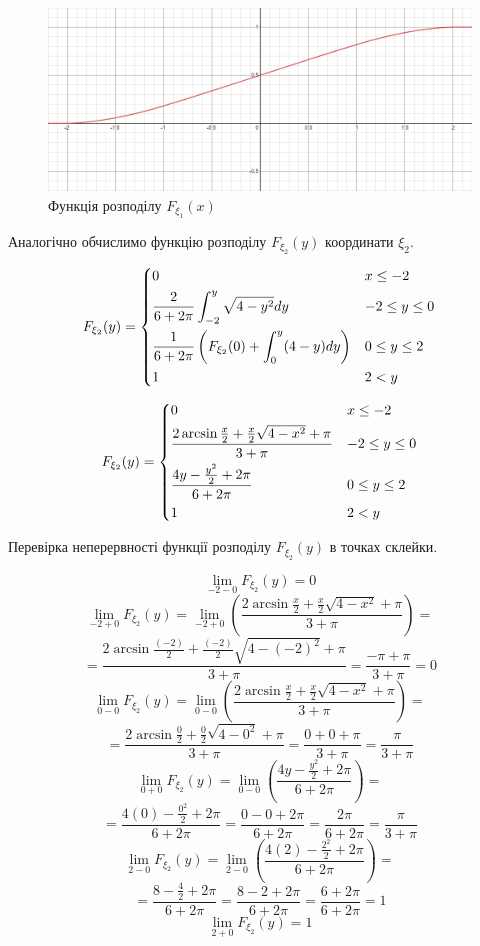 \documentclass[14pt, a4paper, ukrainian]{extreport}
\begin{document}
	\begin{figure}[H]
		\centering
		\includegraphics[width=\textwidth]{./Image/Im_08_F1.png}
		\caption{Функція розподілу $F_{\xi_1}(x)$}
		\label{im:F1}
	\end{figure}
	
	Аналогічно обчислимо функцію розподілу $F_{\xi_2}(y)$ координати $\xi_2$.
	
	$$ F_{\xi_2}(y) = 
	\begin{dcases}
			0 & x \le -2\\
			\dfrac{2}{6+2\pi}\int_{-2}^{y}\sqrt{4-y^2}dy & -2 \le y \le 0\\
			\dfrac{1}{6+2\pi}\left(F_{\xi_2}(0) +  \int_{0}^{y}(4-y)dy \right)& 0 \le y \le 2\\
			1 & 2 < y\\
	\end{dcases}
	$$
	
	$$ F_{\xi_2}(y) = 
	\begin{dcases}
		0 & x \le -2\\
		\dfrac{2\arcsin{\frac{x}{2}} + \frac{x}{2}\sqrt{4-x^2} + \pi}{3+\pi} & -2 \le y \le 0\\
		\dfrac{4y - \frac{y^2}{2} + 2\pi}{6+2\pi}& 0 \le y \le 2\\
		1 & 2 < y\\
	\end{dcases}
	$$
	
		Перевірка неперервності функції розподілу $F_{\xi_2}(y)$ в точках склейки.
		
		$$\lim\limits_{-2-0}F_{\xi_2}(y) = 0
		$$
		$$\lim\limits_{-2+0}F_{\xi_2}(y) = \lim\limits_{-2+0}\left(\dfrac{2\arcsin{\frac{x}{2}} + \frac{x}{2}\sqrt{4-x^2} + \pi}{3+\pi}\right) =
		$$
		$$ = \dfrac{2\arcsin{\frac{(-2)}{2}} + \frac{(-2)}{2}\sqrt{4-(-2)^2} + \pi}{3+\pi} = \dfrac{-\pi + \pi}{3+\pi} = 0
		$$
		$$\lim\limits_{0-0}F_{\xi_2}(y) = \lim\limits_{0-0}\left(\dfrac{2\arcsin{\frac{x}{2}} + \frac{x}{2}\sqrt{4-x^2} + \pi}{3+\pi}\right) = 
		$$
		$$ = \dfrac{2\arcsin{\frac{0}{2}} + \frac{0}{2}\sqrt{4-0^2} + \pi}{3+\pi} = \dfrac{0 +0 +\pi}{3+\pi} = \dfrac{\pi}{3+\pi}
		$$
		$$\lim\limits_{0+0}F_{\xi_2}(y) = \lim\limits_{0-0}\left(\dfrac{4y - \frac{y^2}{2} + 2\pi}{6+2\pi}\right) =
		$$
		$$ = \dfrac{4(0) - \frac{0^2}{2} + 2\pi}{6+2\pi} = \dfrac{0 - 0 + 2\pi}{6+2\pi} = \dfrac{2\pi}{6+2\pi} = \dfrac{\pi}{3+\pi}
		$$
		$$ \lim\limits_{2-0}F_{\xi_2}(y) = \lim\limits_{2-0}\left(\dfrac{4(2) - \frac{2^2}{2} + 2\pi}{6+2\pi}\right) =
		$$
		$$ = \dfrac{8 - \frac{4}{2} + 2\pi}{6+2\pi} = \dfrac{8 - 2 + 2\pi}{6+2\pi} = \dfrac{6 + 2\pi}{6+2\pi} = 1
		$$
		$$ \lim\limits_{2+0}F_{\xi_2}(y) = 1
		$$
		
\end{document}
